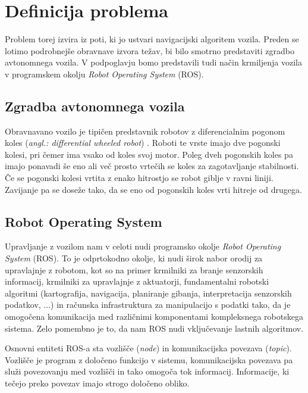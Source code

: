 \documentclass[final,5p,times,twocolumn]{elsarticle}
\begin{document}
\section{Definicija problema}

Problem torej izvira iz poti, ki jo ustvari navigacijski algoritem vozila. Preden se lotimo podrobnejše obravnave izvora težav, bi bilo smotrno predstaviti zgradbo avtonomnega vozila. V podpoglavju bomo predstavili tudi način krmiljenja vozila v programskem okolju \textit{Robot Operating System} (ROS).

\subsection{Zgradba avtonomnega vozila}

Obravnavano vozilo je tipičen predstavnik robotov z diferencialnim pogonom koles (\textit{angl.: differential wheeled robot}) \citep{difrobots}.
Roboti te vrste imajo dve pogonski kolesi, pri čemer ima vsako od koles svoj motor. Poleg dveh pogonskih koles pa imajo ponavadi še eno ali več prosto vrtečih se koles za zagotavljanje stabilnosti. Če se pogonski kolesi vrtita z enako hitrostjo se robot giblje v ravni liniji. Zavijanje pa se doseže tako, da se eno od pogonskih koles vrti hitreje od drugega. %


\subsection{Robot Operating System}

Upravljanje z vozilom nam v celoti nudi programsko okolje \textit{Robot Operating System} (ROS). To je odprtokodno okolje, ki nudi širok nabor orodij za upravlajnje z robotom, kot so na primer krmilniki za branje senzorskih informacij, krmilniki za upravlajnje z aktuatorji, fundamentalni robotski algoritmi (kartografija, navigacija, planiranje gibanja, interpretacija senzorskih podatkov, ...) in računska infrastruktura za manipulacijo s podatki tako, da je omogočena komunikacija med različnimi komponentami kompleksnega robotskega sistema. Zelo pomembno je to, da nam ROS nudi vključevanje lastnih algoritmov.

Osnovni entiteti ROS-a sta vozlišče (\textit{node}) in komunikacijska povezava (\textit{topic}). Vozlišče je program z določeno funkcijo v sistemu, komunikacijska povezava pa služi povezovanju med vozlišči in tako omogoča tok informacij. Informacije, ki tečejo preko povezav imajo strogo določeno obliko.
\end{document}
